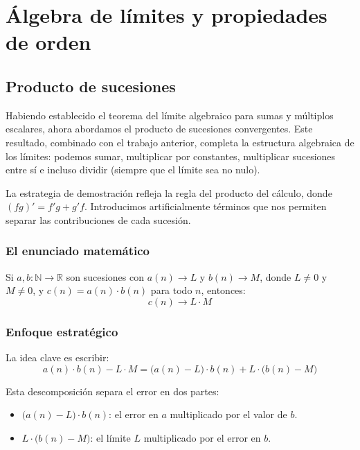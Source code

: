 \chapter{Álgebra de límites y propiedades de orden}

\section{Producto de sucesiones}

Habiendo establecido el teorema del límite algebraico para sumas y múltiplos
escalares, ahora abordamos el producto de sucesiones convergentes. Este resultado,
combinado con el trabajo anterior, completa la estructura algebraica de los límites:
podemos sumar, multiplicar por constantes, multiplicar sucesiones entre sí e incluso
dividir (siempre que el límite sea no nulo).

La estrategia de demostración refleja la regla del producto del cálculo, donde
$(fg)' = f'g + g'f$. Introducimos artificialmente términos que nos permiten separar
las contribuciones de cada sucesión.

\subsection{El enunciado matemático}

\begin{theorem}[ProdLimNeNe]
  Si $a, b : \mathbb{N} \to \mathbb{R}$ son sucesiones con $a(n) \to L$ y
  $b(n) \to M$, donde $L \neq 0$ y $M \neq 0$, y $c(n) = a(n) \cdot b(n)$
  para todo $n$, entonces:
  \[
    c(n) \to L \cdot M
  \]
\end{theorem}

\subsection{Enfoque estratégico}

La idea clave es escribir:
\[
  a(n) \cdot b(n) - L \cdot M
  = \bigl(a(n) - L\bigr) \cdot b(n) + L \cdot \bigl(b(n) - M\bigr)
\]

Esta descomposición separa el error en dos partes:
\begin{itemize}
  \item $\bigl(a(n)-L\bigr)\cdot b(n)$: el error en $a$ multiplicado por el valor de $b$.
  \item $L\cdot\bigl(b(n)-M\bigr)$: el límite $L$ multiplicado por el error en $b$.
\end{itemize}


